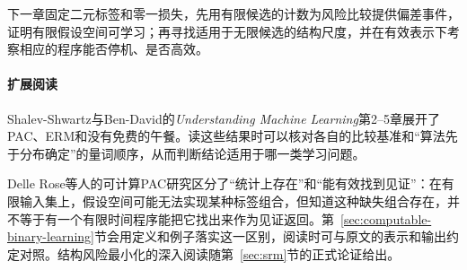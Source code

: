 下一章固定二元标签和零一损失，先用有限候选的计数为风险比较提供偏差事件，证明有限假设空间可学习；再寻找适用于无限候选的结构尺度，并在有效表示下考察相应的程序能否停机、是否高效。

\paragraph{扩展阅读}
Shalev-Shwartz与Ben-David的\textit{Understanding Machine Learning}第2--5章展开了PAC、ERM和没有免费的午餐。读这些结果时可以核对各自的比较基准和“算法先于分布确定”的量词顺序，从而判断结论适用于哪一类学习问题。

Delle Rose等人的可计算PAC研究区分了“统计上存在”和“能有效找到见证”：在有限输入集上，假设空间可能无法实现某种标签组合，但知道这种缺失组合存在，并不等于有一个有限时间程序能把它找出来作为见证返回。第~\ref{sec:computable-binary-learning}节会用定义和例子落实这一区别，阅读时可与原文的表示和输出约定对照。结构风险最小化的深入阅读随第~\ref{sec:srm}节的正式论证给出。
